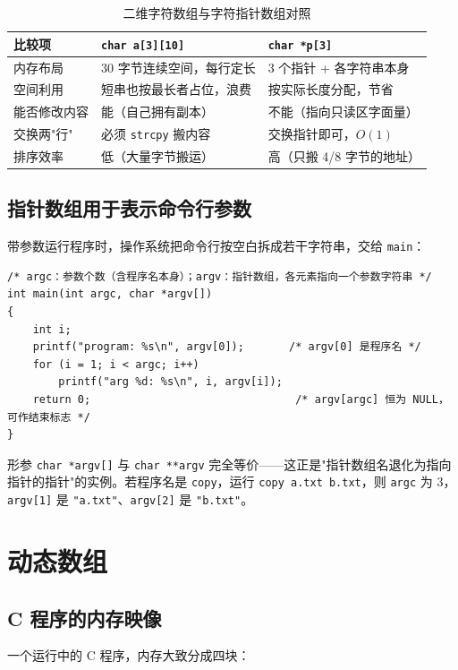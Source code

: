 \begin{table}[htbp]
\centering
\caption{二维字符数组与字符指针数组对照}
\footnotesize
\begin{tabularx}{\textwidth}{@{}p{2.6cm}p{3.4cm}X@{}}
\toprule
比较项 & \texttt{char a[3][10]} & \texttt{char *p[3]} \\
\midrule
内存布局 & 30 字节连续空间，每行定长 & 3 个指针 + 各字符串本身 \\
空间利用 & 短串也按最长者占位，浪费 & 按实际长度分配，节省 \\
能否修改内容 & 能（自己拥有副本） & 不能（指向只读区字面量） \\
交换两"行" & 必须 \texttt{strcpy} 搬内容 & 交换指针即可，$O(1)$ \\
排序效率 & 低（大量字节搬运） & 高（只搬 4/8 字节的地址） \\
\bottomrule
\end{tabularx}
\end{table}

\subsection{指针数组用于表示命令行参数}
带参数运行程序时，操作系统把命令行按空白拆成若干字符串，交给 \texttt{main}：
\begin{lstlisting}
/* argc：参数个数（含程序名本身）；argv：指针数组，各元素指向一个参数字符串 */
int main(int argc, char *argv[])
{
    int i;
    printf("program: %s\n", argv[0]);       /* argv[0] 是程序名 */
    for (i = 1; i < argc; i++)
        printf("arg %d: %s\n", i, argv[i]);
    return 0;                                /* argv[argc] 恒为 NULL，可作结束标志 */
}
\end{lstlisting}
形参 \texttt{char *argv[]} 与 \texttt{char **argv} 完全等价——这正是"指针数组名退化为指向指针的指针"的实例。若程序名是 \texttt{copy}，运行 \texttt{copy a.txt b.txt}，则 \texttt{argc} 为 3，\texttt{argv[1]} 是 \texttt{"a.txt"}、\texttt{argv[2]} 是 \texttt{"b.txt"}。

\section{动态数组}
\subsection{C 程序的内存映像}
一个运行中的 C 程序，内存大致分成四块：


